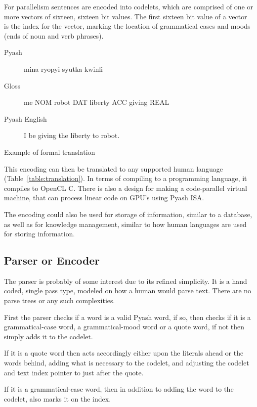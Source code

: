 For parallelism sentences are encoded into codelets\cite{codelet}, which are comprised of one
or more vectors of sixteen, sixteen bit values. The first sixteen bit value of a
vector is the index for the vector, marking the location of grammatical cases
and moods (ends of noun and verb phrases). 


\begin{table}
  \begin{description}
    \item[Pyash] mina ryopyi syutka kwinli
    \item[Gloss] me NOM robot DAT liberty ACC giving REAL
    \item[Pyash English] I be giving the liberty to robot.
  \end{description}
  \caption{Example of formal translation}\label{table:translation}
\end{table}

This encoding can then be translated to any supported human language
(Table~\ref{table:translation}). In terms
of compiling to a programming language, it compiles to OpenCL C. There is also a
design\cite{vmOnOpenCL} for making a code-parallel virtual machine, that can process linear code
on GPU's using Pyash ISA.\@

The encoding could also be used for storage of information, similar to a
database, as well as for knowledge management, similar to how human languages
are used for storing information.

\subsection{Parser or Encoder}

The parser is probably of some interest due to its refined simplicity. 
It is a hand coded, single pass type, 
modeled on how a human would parse text. There are no parse trees or any such
complexities.

First the parser checks if a word is a valid Pyash word, if so, then checks if it is a
grammatical-case word,
 a grammatical-mood word or a quote word, if not then simply adds it to the
 codelet.

 If it is a quote word then acts
 accordingly either upon the literals ahead or the words behind,
 adding what is necessary to the codelet,
 and adjusting the codelet and text index pointer to just after the quote. 

 If it is a grammatical-case word, then in addition to adding the word to the codelet, 
 also marks it on the index. 

